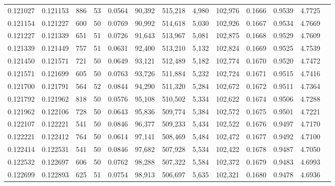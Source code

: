 \begin{tabular}{rrrrrrrrrrrrr}
0.121027 & 0.121153 &   886 &  53 &                                     0.0564 &  90,392 & 515,218 &   4,980 & 102,976 & 0.1666 & 0.9539 & 4.7725 \\
0.121154 & 0.121227 &   600 &  50 &                                     0.0769 &  90,992 & 514,618 &   5,030 & 102,926 & 0.1667 & 0.9534 & 4.7669 \\
0.121227 & 0.121339 &   651 &  51 &                                     0.0726 &  91,643 & 513,967 &   5,081 & 102,875 & 0.1668 & 0.9529 & 4.7609 \\
0.121339 & 0.121449 &   757 &  51 &                                     0.0631 &  92,400 & 513,210 &   5,132 & 102,824 & 0.1669 & 0.9525 & 4.7539 \\
0.121450 & 0.121571 &   721 &  50 &                                     0.0649 &  93,121 & 512,489 &   5,182 & 102,774 & 0.1670 & 0.9520 & 4.7472 \\
0.121571 & 0.121699 &   605 &  50 &                                     0.0763 &  93,726 & 511,884 &   5,232 & 102,724 & 0.1671 & 0.9515 & 4.7416 \\
0.121700 & 0.121791 &   564 &  52 &                                     0.0844 &  94,290 & 511,320 &   5,284 & 102,672 & 0.1672 & 0.9511 & 4.7364 \\
0.121792 & 0.121962 &   818 &  50 &                                     0.0576 &  95,108 & 510,502 &   5,334 & 102,622 & 0.1674 & 0.9506 & 4.7288 \\
0.121962 & 0.122106 &   728 &  50 &                                     0.0643 &  95,836 & 509,774 &   5,384 & 102,572 & 0.1675 & 0.9501 & 4.7221 \\
0.122107 & 0.122221 &   541 &  50 &                                     0.0846 &  96,377 & 509,233 &   5,434 & 102,522 & 0.1676 & 0.9497 & 4.7170 \\
0.122221 & 0.122412 &   764 &  50 &                                     0.0614 &  97,141 & 508,469 &   5,484 & 102,472 & 0.1677 & 0.9492 & 4.7100 \\
0.122414 & 0.122531 &   541 &  50 &                                     0.0846 &  97,682 & 507,928 &   5,534 & 102,422 & 0.1678 & 0.9487 & 4.7050 \\
0.122532 & 0.122697 &   606 &  50 &                                     0.0762 &  98,288 & 507,322 &   5,584 & 102,372 & 0.1679 & 0.9483 & 4.6993 \\
0.122699 & 0.122893 &   625 &  51 &                                     0.0754 &  98,913 & 506,697 &   5,635 & 102,321 & 0.1680 & 0.9478 & 4.6936 \\

\end{tabular}
